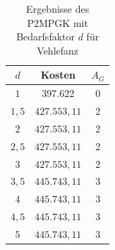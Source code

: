 \documentclass[11pt,a4paper]{article}
\theoremstyle{my_th_style1}
\begin{document}
\begin{table}[h]
	\centering
	\begin{tabular}{c|c|c}
		\centering
		$d$ & Kosten & $A_G$ \\	
		\hline
		$1$   	 &  397.622 & 0  \\
		$1,5$ 	&   $427.553,11$  & 2  \\
		$2$   	&   $427.553,11$ & 2  \\
		$2,5$   	&   $427.553,11$ & 2  \\
		$3$    &   $427.553,11$ & 2  \\
		$3,5$   	&   $445.743,11$ & 3  \\
		$4$   	&   $445.743,11$& 3  \\
		$4,5$    & $445.743,11$ & 3 \\
		$5$   	&   $445.743,11$& 3  \\	
	\end{tabular}
	\label{P2PGKBedarfV}
	\caption{Ergebnisse des P2MPGK mit Bedarfsfaktor $d$ f\"ur Vehlefanz} 
\end{table}


\thispagestyle{empty}
\end{document}
